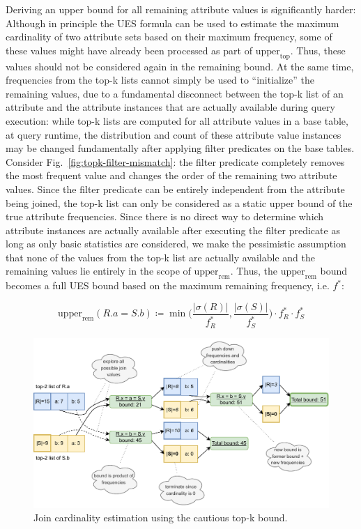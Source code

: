 Deriving an upper bound for all remaining attribute values is significantly harder: Although in principle the UES formula can be used to estimate the maximum cardinality of two attribute sets based on their maximum frequency, some of these values might have already been processed as part of $\text{upper}_\text{top}$. 
Thus, these values should not be considered again in the remaining bound. 
At the same time, frequencies from the top-k lists cannot simply be used to ``initialize'' the remaining values, due to a fundamental disconnect between the top-k list of an attribute  and the attribute instances that are actually available during query execution: while top-k lists are computed for all attribute values in a base table, at query runtime, the distribution and count of these attribute value instances may be changed fundamentally after applying filter predicates on the base tables. 
Consider Fig.~\ref{fig:topk-filter-mismatch}: the filter predicate completely removes the most frequent value and changes the order of the remaining two attribute values. 
Since the filter predicate can be entirely independent from the attribute being joined, the top-k list can only be considered as a static upper bound of the true attribute frequencies.
Since there is no direct way to determine which attribute instances are actually available after executing the filter predicate as long as only basic statistics are considered, we make the pessimistic assumption that none of the values from the top-k list are actually available and the remaining values lie entirely in the scope of $\text{upper}_\text{rem}$.
Thus, the $\text{upper}_\text{rem}$ bound becomes a full UES bound based on the maximum remaining frequency, i.e. $f^\ast$:

\begin{definition}
    \begin{equation}
        \text{upper}_\text{rem}(R.a = S.b) \coloneqq \min \biggl( \frac{|\sigma(R)|}{f^\ast_R}, \frac{|\sigma(S)|}{f^\ast_S} \biggr) \cdot f^\ast_R \cdot f^\ast_S
    \end{equation}
    \label{def:approx-bound-remainder}
\end{definition}

\begin{figure}[tb]
	\centering
	\includegraphics[width=\linewidth]{figures/top-k-estimation-cautious.pdf}
	\caption{Join cardinality estimation using the cautious top-k bound.}
	\label{fig:topk-formula-cautious}
\end{figure}

